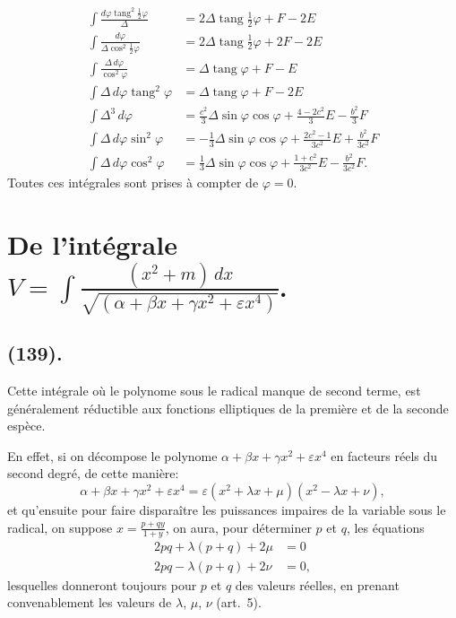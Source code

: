 \documentclass{article}
\begin{document}
\[ \begin{aligned} \int\frac{d\varphi\operatorname{tang}^{2}\frac{1}{2}\varphi}{\Delta}&=2\Delta\operatorname{tang}\tfrac{1}{2}\varphi+F-2E\\ \int\frac{d\varphi}{\Delta\cos^{2}\frac{1}{2}\varphi}&=2\Delta\operatorname{tang}\tfrac{1}{2}\varphi+2F-2E\\ \int\frac{\Delta\,d\varphi}{\cos^{2}\varphi}&=\Delta\operatorname{tang}\varphi+F-E\\ \int\Delta\,d\varphi\operatorname{tang}^{2}\varphi&=\Delta\operatorname{tang}\varphi+F-2E\\ \int\Delta^{3}\,d\varphi&=\frac{c^{2}}{3}\Delta\sin\varphi\cos\varphi+\frac{4-2c^{2}}{3}E-\frac{b^{2}}{3}F\\ \int\Delta\,d\varphi\sin^{2}\varphi&=-\tfrac{1}{3}\Delta\sin\varphi\cos\varphi+\frac{2c^{2}-1}{3c^{2}}E+\frac{b^{2}}{3c^{2}}F\\ \int\Delta\,d\varphi\cos^{2}\varphi&=\tfrac{1}{3}\Delta\sin\varphi\cos\varphi+\frac{1+c^{2}}{3c^{2}}E-\frac{b^{2}}{3c^{2}}F. \end{aligned} \]
Toutes ces intégrales sont prises à compter de $\varphi=0$.

\section*{De l'intégrale $V=\displaystyle\int\frac{(x^{2}+m)\,dx}{\sqrt{(\alpha+\beta x+\gamma x^{2}+\varepsilon x^{4})}}$.}

\subsection*{(139).}

Cette intégrale où le polynome sous le radical manque de second terme, est généralement réductible aux fonctions elliptiques de la première et de la seconde espèce.

En effet, si on décompose le polynome $\alpha+\beta x+\gamma x^{2}+\varepsilon x^{4}$ en facteurs réels du second degré, de cette manière:
\[ \alpha+\beta x+\gamma x^{2}+\varepsilon x^{4}=\varepsilon(x^{2}+\lambda x+\mu)(x^{2}-\lambda x+\nu), \]
et qu'ensuite pour faire disparaître les puissances impaires de la variable sous le radical, on suppose $x=\frac{p+qy}{1+y}$, on aura, pour déterminer $p$ et $q$, les équations
\[ \begin{aligned} 2pq+\lambda(p+q)+2\mu&=0\\ 2pq-\lambda(p+q)+2\nu&=0, \end{aligned} \]
lesquelles donneront toujours pour $p$ et $q$ des valeurs réelles, en prenant convenablement les valeurs de $\lambda$, $\mu$, $\nu$ (art.~5).
\end{document}
